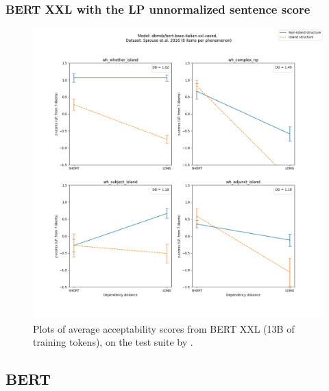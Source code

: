 \subsubsection{BERT XXL with the LP unnormalized sentence score}
\begin{figure}[h]
	\centering
	\includegraphics[width=1\textwidth]{images/Chapter1/Sprouse_wh_dbmdz_bert-base-italian-xxl-cased_LP-zscores-likert-2022-09-14_h17m27s24.png} 
	\caption{Plots of average acceptability scores from BERT XXL (13B of training tokens), on the test suite by \citet{sprouse2016experimental}.}
	\label{fig:sprouse_bert_lp} 
	\medskip
\end{figure}	

\clearpage
\subsection{BERT}
